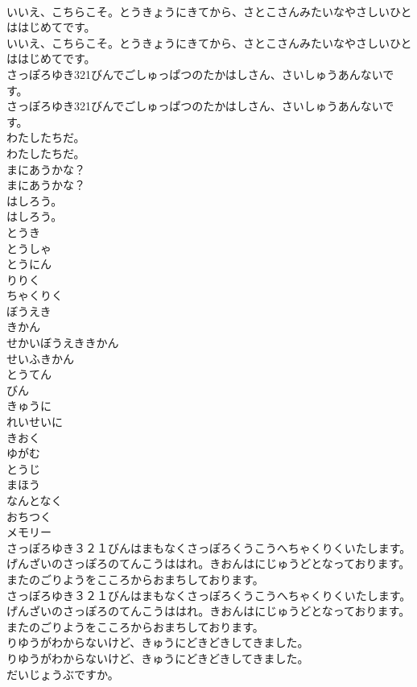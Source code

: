 \documentclass[8pt]{extreport}
\begin{document}
\begin{CJK}{UTF8}{min}
\\	いいえ、こちらこそ。とうきょうにきてから、さとこさんみたいなやさしいひとははじめてです。	
\\	いいえ、こちらこそ。とうきょうにきてから、さとこさんみたいなやさしいひとははじめてです。 
\\	さっぽろゆき321びんでごしゅっぱつのたかはしさん、さいしゅうあんないです。	
\\	さっぽろゆき321びんでごしゅっぱつのたかはしさん、さいしゅうあんないです。 
\\	わたしたちだ。	
\\	わたしたちだ。 
\\	まにあうかな？	
\\	まにあうかな？ 
\\	はしろう。	
\\	はしろう。 
\\	とうき
\\	とうしゃ
\\	とうにん
\\	りりく
\\	ちゃくりく
\\	ぼうえき
\\	きかん
\\	せかいぼうえききかん
\\	せいふきかん
\\	とうてん
\\	びん
\\	きゅうに
\\	れいせいに
\\	きおく
\\	ゆがむ
\\	とうじ
\\	まほう
\\	なんとなく
\\	おちつく
\\	メモリー
\\	さっぽろゆき３２１びんはまもなくさっぽろくうこうへちゃくりくいたします。げんざいのさっぽろのてんこうははれ。きおんはにじゅうどとなっております。またのごりようをこころからおまちしております。	
\\	さっぽろゆき３２１びんはまもなくさっぽろくうこうへちゃくりくいたします。げんざいのさっぽろのてんこうははれ。きおんはにじゅうどとなっております。またのごりようをこころからおまちしております。 
\\	りゆうがわからないけど、きゅうにどきどきしてきました。	
\\	りゆうがわからないけど、きゅうにどきどきしてきました。 
\\	だいじょうぶですか。	

\end{CJK}
\end{document}
